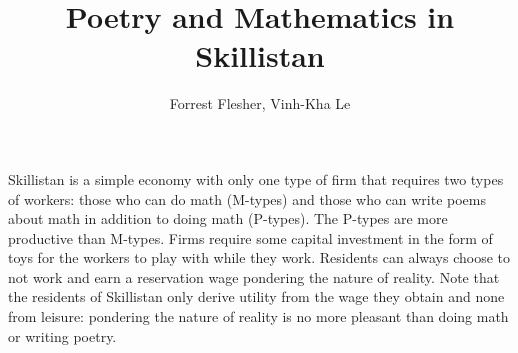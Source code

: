 \documentclass[12pt]{article}
\title{Poetry and Mathematics in Skillistan}
\author{Forrest Flesher, Vinh-Kha Le}
\begin{document}
\maketitle


\vspace*{0.15in}


Skillistan is a simple economy with only one type of firm that requires two types of workers:
those who can do math (M-types) and those who can write poems about math in addition
to doing math (P-types). The P-types are more productive than M-types. Firms
require some capital investment in the form of toys for the workers to play with while they
work. Residents can always choose to not work and earn a reservation wage pondering the
nature of reality. Note that the residents of Skillistan only derive utility from the wage
they obtain and none from leisure: pondering the nature of reality is no more pleasant
than doing math or writing poetry.
\end{document}
